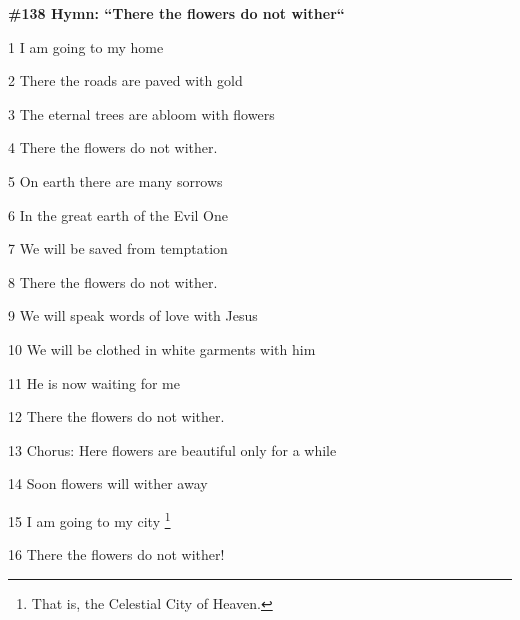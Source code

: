 
\textbf{\#138 Hymn: ``There the flowers do not wither``}

1  I am going to my home

2 There the roads are paved with gold

3 The eternal trees are abloom with flowers

4 There the flowers do not wither.

5 On earth there are many sorrows

6 In the great earth of the Evil One

7 We will be saved from temptation

8 There the flowers do not wither.

9 We will speak words of love with Jesus

10 We will be clothed in white garments with him

11 He is now waiting for me

12 There the flowers do not wither.

13 Chorus: Here flowers are beautiful only for a while

14 Soon flowers will wither away

15 I am going to my city \footnote{That is, the Celestial City of Heaven.}

16 There the flowers do not wither!

